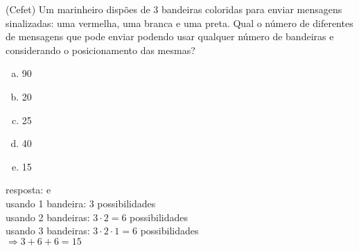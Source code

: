 \begin{ex}
(Cefet) Um marinheiro dispões de 3 bandeiras coloridas para enviar mensagens sinalizadas: uma vermelha, uma branca e uma preta. Qual o número de diferentes de mensagens que pode enviar podendo usar qualquer número de bandeiras e considerando o posicionamento das mesmas?
   \begin{enumerate}[(a)]
   \item 90
   \item 20
   \item 25
   \item 40
   \item 15
   \end{enumerate}
     \begin{sol}
      resposta: e \\
      usando 1 bandeira: 3 possibilidades\\
      usando 2 bandeiras: $3\cdot2=6$ possibilidades \\
      usando 3 bandeiras: $3\cdot2\cdot1=6$ possibilidades \\
      $\Longrightarrow 3+6+6 = 15$
     \end{sol}
\end{ex}